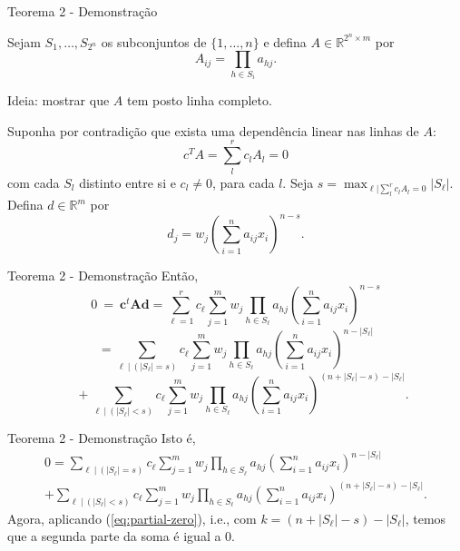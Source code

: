 \documentclass{beamer}
\begin{document}
\begin{frame}{Teorema 2 - Demonstração}

    Sejam $S_1,\dots, S_{2^n}$ os subconjuntos de $\{1,\dots,n\}$ e defina $A \in \mathbb R^{2^n \times m}$ por 
    \[
        A_{ij} = \prod_{h \in S_i} a_{hj}.
    \]

    Ideia: mostrar que $A$ tem posto linha completo. 

    \pause
    Suponha por contradição que exista uma dependência linear nas linhas de $A$:
    \[
        c^T A = \sum_l^r c_l A_{l} = 0
    \] 
    com cada $S_l$ distinto entre si e $c_l \neq 0$, para cada $l$.
    Seja $s=\max_{\ell | \sum_l^r c_l A_{l} = 0} |S_\ell|$. 
    \pause
    Defina $d \in \mathbb R^m$ por 
    \[
        d_j = w_j\left( \sum_{i=1}^{n} a_{ij} x_{i} \right)^{n-s}.
    \]
\end{frame}

\begin{frame}{Teorema 2 - Demonstração}
    Então,
    \begin{equation*}
        0 \ = \ \mathbf{c}^{t} \mathbf{A} \mathbf{d} = \sum_{\ell=1}^{r} c_{\ell} \sum_{j=1}^{m} w_{j} \prod_{h \in S_{\ell}} a_{hj} \left( \sum_{i=1}^{n} a_{ij} x_{i} \right)^{n-s}
    \end{equation*}
    \pause
    \begin{equation*}
        = \sum_{\ell \ | \ (|S_{\ell}| = s)} c_{\ell} \sum_{j=1}^{m} w_{j} \prod_{h \in S_{\ell}} a_{hj} \left( \sum_{i=1}^{n} a_{ij} x_{i} \right)^{n - |S_{\ell}|}
    \end{equation*}
    \pause
    \begin{equation*}
        \quad + \sum_{\ell \ | \ (|S_{\ell}| < s)} c_{\ell} \sum_{j=1}^{m} w_{j} \prod_{h \in S_{\ell}} a_{hj} \left( \sum_{i=1}^{n} a_{ij} x_{i} \right)^{(n + |S_{\ell}| - s) - |S_{\ell}|}.
    \end{equation*}

\end{frame}

\begin{frame}{Teorema 2 - Demonstração}
    Isto é, 
    \begin{align*}
        0 = \sum_{\ell \ | \ (|S_{\ell}| = s)} c_{\ell} \sum_{j=1}^{m} w_{j} \prod_{h \in S_{\ell}} a_{hj} \left( \sum_{i=1}^{n} a_{ij} x_{i} \right)^{n - |S_{\ell}|}
        \\ + \sum_{\ell \ | \ (|S_{\ell}| < s)} c_{\ell} \sum_{j=1}^{m} w_{j} \prod_{h \in S_{\ell}} a_{hj} \left( \sum_{i=1}^{n} a_{ij} x_{i} \right)^{(n + |S_{\ell}| - s) - |S_{\ell}|}.
    \end{align*}
    \pause
    Agora, aplicando (\ref{eq:partial-zero}), i.e., com $k=(n+|S_\ell|-s)-|S_\ell|$, temos que a segunda parte da soma é igual a 0.
\end{frame}
\end{document}
